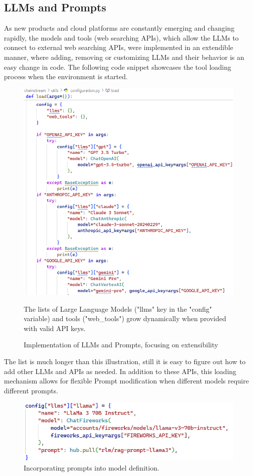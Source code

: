 \subsection{LLMs and Prompts}
As new products and cloud platforms are constantly emerging and changing rapidly, the models and tools (web searching APIs), which allow the LLMs to connect to external web searching APIs, were implemented in an extendible manner, where adding, removing or customizing LLMs and their behavior is an easy change in code. The following code snippet showcases the tool loading process when the environment is started.
\begin{figure}[H]
    \centering
    \includegraphics[width=.9\linewidth]{./figures/llms-implementation.png}
    \caption{Implementation of LLMs and Prompts, focusing on extensibility}
    \begin{flushleft}
        \small The lists of Large Language Models ("llms" key in the "config" variable) and tools ("web\_tools") grow dynamically when provided with valid API keys.
    \end{flushleft}
\end{figure}
The list is much longer than this illustration, still it is easy to figure out how to add other LLMs and APIs as needed.\newline
In addition to these APIs, this loading mechanism allows for flexible Prompt modification when different models require different prompts.
\begin{figure}[H]
    \centering
    \includegraphics[width=\linewidth]{./figures/prompt-template-impl.png}
    \caption{Incorporating prompts into model definition.}
\end{figure}
